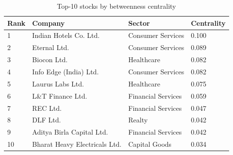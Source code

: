 \begin{table}[!ht]
\centering
\caption{Top-10 stocks by betweenness centrality}
\label{tab:top10-betweenness}
\begin{tabular}{llll}
\toprule
Rank & Company & Sector & Centrality \\
\midrule
1 & Indian Hotels Co. Ltd. & Consumer Services & 0.100 \\
2 & Eternal Ltd. & Consumer Services & 0.089 \\
3 & Biocon Ltd. & Healthcare & 0.082 \\
4 & Info Edge (India) Ltd. & Consumer Services & 0.082 \\
5 & Laurus Labs Ltd. & Healthcare & 0.075 \\
6 & L\&T Finance Ltd. & Financial Services & 0.059 \\
7 & REC Ltd. & Financial Services & 0.047 \\
8 & DLF Ltd. & Realty & 0.042 \\
9 & Aditya Birla Capital Ltd. & Financial Services & 0.042 \\
10 & Bharat Heavy Electricals Ltd. & Capital Goods & 0.034 \\
\bottomrule
\end{tabular}
\end{table}
